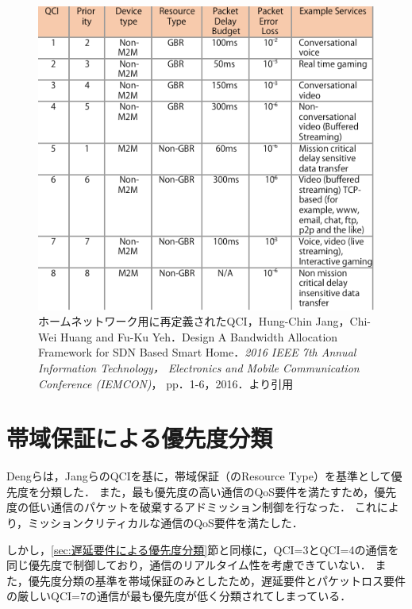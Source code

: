 \documentclass[a4paper,11pt,uplatex]{ujreport}
\begin{document}
  \begin{figure}[!b]
    \centering
    \includegraphics[]{img/qci.pdf}
    \caption{ホームネットワーク用に再定義されたQCI，Hung-Chin Jang，Chi-Wei Huang and Fu-Ku Yeh．Design
    A Bandwidth Allocation Framework for SDN Based Smart
    Home．\textit{2016 IEEE 7th Annual Information Technology，
    Electronics and Mobile Communication Conference (IEMCON)}，
    pp．1-6，2016．\cite{Framework}より引用}
    \label{fig:qci}
  \end{figure}

\section{帯域保証による優先度分類}
\label{sec:帯域保証による優先度分類}

  Dengらは，JangらのQCIを基に，帯域保証（のResource Type）を基準として優先度を分類した\cite{AQRA}．
  また，最も優先度の高い通信のQoS要件を満たすため，優先度の低い通信のパケットを破棄するアドミッション制御を行なった．
  これにより，ミッションクリティカルな通信のQoS要件を満たした．\par
  しかし，\ref{sec:遅延要件による優先度分類}節と同様に，QCI=3とQCI=4の通信を同じ優先度で制御しており，通信のリアルタイム性を考慮できていない．
  また，優先度分類の基準を帯域保証のみとしたため，遅延要件とパケットロス要件の厳しいQCI=7の通信が最も優先度が低く分類されてしまっている．
\end{document}
